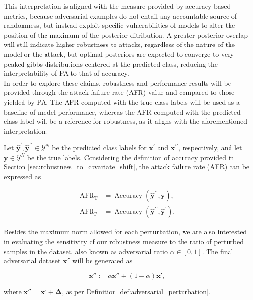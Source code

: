 This interpretation is aligned with the measure provided by accuracy-based metrics, 
because adversarial examples do not entail any accountable source of randomness, 
but instead exploit specific vulnerabilities of models to alter the position of the 
maximum of the posterior ditribution. A greater posterior overlap will still
indicate higher robustness to attacks, regardless of the nature of the model or the
attack, but optimal posteriors are expected to converge to very peaked gibbs
distributions centered at the predicted class, reducing the interpretability of PA
to that of accuracy. \\

In order to explore these claims, robustness and performance results will be
provided through the attack failure rate (AFR) value and compared to those
yielded by PA. The AFR computed with the true class labels will be used as a baseline
of model performance, whereas the AFR computed with the predicted class label
will be a reference for robustness, as it aligns with the aforementioned
interpretation.

\begin{definition}
    Let $\bm{\hat{y}^\prime}, \bm{\hat{y}^{\prime\prime}} \in \mathcal{Y}^N$ be the predicted class 
    labels for $\bm{x}^\prime$ and $\bm{x}^{\prime \prime}$, respectively, 
    and let $\bm{y}\in \mathcal{Y}^N$ be the true labels. Considering the definition of accuracy
    provided in Section \ref{sec:robustness_to_covariate_shift}, the attack failure rate (AFR)
    can be expressed as

    $$
    \begin{aligned}
        \operatorname{AFR}_\text{T} &= \operatorname{Accuracy}(\bm{\hat{y}^{\prime \prime}}, \bm{y}), \\
        \operatorname{AFR}_\text{P} &= \operatorname{Accuracy}(\bm{\hat{y}^{\prime \prime}}, \bm{\hat{y}^{\prime}}).
    \end{aligned}
    $$

\end{definition}

\begin{definition}
    Besides the maximum norm allowed for each perturbation, we are also interested in evaluating 
    the sensitivity of our robustness measure to the ratio of perturbed samples in the dataset, 
    also known as adversarial ratio $\alpha \in [0,1]$. The final adversarial dataset $\bm{x}''$ will be generated as

    $$
    \bm{x}'' := \alpha \bm{x}'' + (1 - \alpha) \bm{x}',
    $$

    where $\bm{x}'' = \bm{x}' + \bm{\Delta}$, as per Definition \ref{def:adversarial_perturbation}.
\end{definition}

